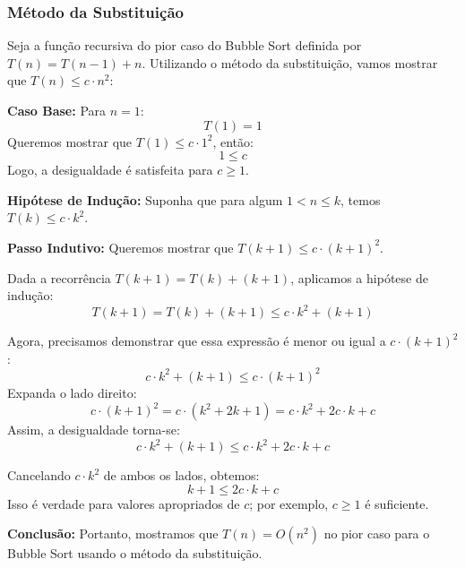 \subsubsection{Método da Substituição}

Seja a função recursiva do pior caso do Bubble Sort definida por \( T(n) = T(n-1) + n \). Utilizando o método da substituição, vamos mostrar que \( T(n) \leq c \cdot n^2 \):

\textbf{Caso Base:} Para \( n = 1 \):
\[
T(1) = 1
\]
Queremos mostrar que \( T(1) \leq c \cdot 1^2 \), então:
\[
1 \leq c
\]
Logo, a desigualdade é satisfeita para \( c \geq 1 \).

\textbf{Hipótese de Indução:} Suponha que para algum \( 1 < n \leq k \), temos \( T(k) \leq c \cdot k^2 \).

\textbf{Passo Indutivo:} Queremos mostrar que \( T(k + 1) \leq c \cdot (k + 1)^2 \).

Dada a recorrência \( T(k + 1) = T(k) + (k + 1) \), aplicamos a hipótese de indução:
\[
T(k + 1) = T(k) + (k + 1) \leq c \cdot k^2 + (k + 1)
\]

Agora, precisamos demonstrar que essa expressão é menor ou igual a \( c \cdot (k + 1)^2 \):
\[
c \cdot k^2 + (k + 1) \leq c \cdot (k + 1)^2
\]
Expanda o lado direito:
\[
c \cdot (k + 1)^2 = c \cdot (k^2 + 2k + 1) = c \cdot k^2 + 2c \cdot k + c
\]
Assim, a desigualdade torna-se:
\[
c \cdot k^2 + (k + 1) \leq c \cdot k^2 + 2c \cdot k + c
\]

Cancelando \( c \cdot k^2 \) de ambos os lados, obtemos:
\[
k + 1 \leq 2c \cdot k + c
\]
Isso é verdade para valores apropriados de \( c \); por exemplo, \( c \geq 1 \) é suficiente.

\textbf{Conclusão:} Portanto, mostramos que \( T(n) = O(n^2) \) no pior caso para o Bubble Sort usando o método da substituição.
